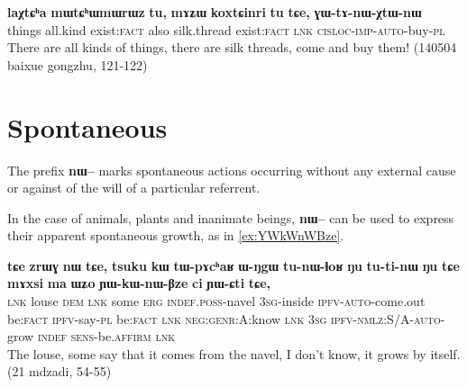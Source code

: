 \documentclass[oldfontcommands,oneside,a4paper,11pt]{article}
\newcommand{\ipa}[1]{\textbf{{\phon\mbox{#1}}}} %
\begin{document}
\begin{exe}
\ex \label{ex:GWtAnWXtWnW}
\gll
\ipa{laχtɕʰa} 	\ipa{mɯtɕʰɯmɯrɯz} 	\ipa{tu,} 	\ipa{mɤʑɯ} 	\ipa{koxtɕinri} 	\ipa{tu} 	\ipa{tɕe,} 	\ipa{ɣɯ-tɤ-nɯ-χtɯ-nɯ} \\ 
things all.kind exist:\textsc{fact} also silk.thread exist:\textsc{fact} \textsc{lnk} \textsc{cisloc-imp-auto}-buy-\textsc{pl} \\
\glt There are all kinds of things, there are silk threads, come and buy them! (140504 baixue gongzhu, 121-122)
\end{exe}


 
\section{Spontaneous}
The prefix \ipa{nɯ--} marks spontaneous actions  occurring without any external cause or against of the will of a particular referrent.

In the case of animals, plants and inanimate beings, \ipa{nɯ--} can be used to express  their apparent spontaneous growth, as in \ref{ex:YWkWnWBze}.
\begin{exe}
\ex \label{ex:YWkWnWBze}
\gll 
\ipa{tɕe} 	\ipa{zrɯɣ} 	\ipa{nɯ} 	\ipa{tɕe,} 	\ipa{tsuku} 	\ipa{kɯ} 	\ipa{tɯ-pɤcʰaʁ} 	\ipa{ɯ-ŋgɯ} 	\ipa{tu-nɯ-ɬoʁ} 	\ipa{ŋu} 	\ipa{tu-ti-nɯ} 	\ipa{ŋu} 	\ipa{tɕe} 	\ipa{mɤxsi} 	\ipa{ma} 	\ipa{ɯʑo} 	\ipa{ɲɯ-kɯ-nɯ-βze} 	\ipa{ci} 	\ipa{ɲɯ-ɕti} 	\ipa{tɕe,} 	\\
\textsc{lnk} louse \textsc{dem} \textsc{lnk} some \textsc{erg} \textsc{indef.poss}-navel \textsc{3sg}-inside \textsc{ipfv-auto}-come.out be:\textsc{fact} \textsc{ipfv}-say-\textsc{pl}  be:\textsc{fact} \textsc{lnk} \textsc{neg:genr:}A:know \textsc{lnk} \textsc{3sg} \textsc{ipfv-nmlz:S/A-auto}-grow \textsc{indef} \textsc{sens}-be.\textsc{affirm} \textsc{lnk} \\
\glt The louse, some say that it comes from the navel, I don't know, it grows by itself. (21 mdzadi, 54-55)
\end{exe}
\end{document}
